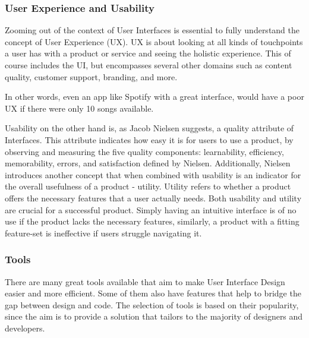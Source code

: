 \subsubsection{User Experience and Usability}
Zooming out of the context of User Interfaces is essential to fully understand the concept of User
Experience (UX). UX is about looking at all kinds of touchpoints a user has with a product or
service and seeing the holistic experience. This of course includes the UI, but encompasses several
other domains such as content quality, customer support, branding, and more.

In other words, even an app like Spotify with a great interface, would have a poor UX if there were
only 10 songs available.

Usability on the other hand is, as Jacob Nielsen suggests, a quality attribute of Interfaces. This
attribute indicates how easy it is for users to use a product, by observing and measuring the five
quality components: learnability, efficiency, memorability, errors, and satisfaction
defined by Nielsen. Additionally, Nielsen introduces another concept that when combined with
usability is an indicator for the overall usefulness of a product - utility. Utility refers to
whether a product offers the necessary features that a user actually needs. Both usability and
utility are crucial for a successful product. Simply having an intuitive interface is of no use if
the product lacks the necessary features, similarly, a product with a fitting feature-set is
ineffective if users struggle navigating it.

\subsubsection{Tools}
There are many great tools available that aim to make User Interface Design easier and more
efficient. Some of them also have features that help to bridge the gap between design and code. The
selection of tools is based on their popularity, since the aim is to provide a solution that
tailors to the majority of designers and developers. %

